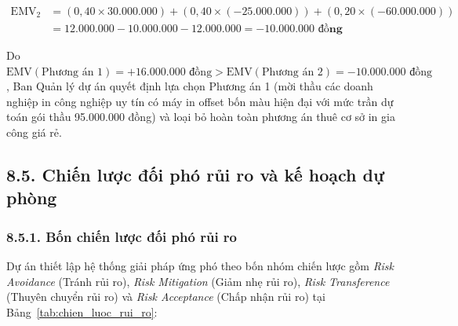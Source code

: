 \begin{equation}
\begin{split}
\text{EMV}_2 &= (0,40 \times 30.000.000) + (0,40 \times (-25.000.000)) + (0,20 \times (-60.000.000)) \\
&= 12.000.000 - 10.000.000 - 12.000.000 = \mathbf{-10.000.000\text{ đồng}}
\end{split}
\end{equation}

Do $\text{EMV}(\text{Phương án 1}) = +16.000.000\text{ đồng} > \text{EMV}(\text{Phương án 2}) = -10.000.000\text{ đồng}$, Ban Quản lý dự án quyết định lựa chọn Phương án 1 (mời thầu các doanh nghiệp in công nghiệp uy tín có máy in offset bốn màu hiện đại với mức trần dự toán gói thầu 95.000.000 đồng) và loại bỏ hoàn toàn phương án thuê cơ sở in gia công giá rẻ.

\subsection{8.5. Chiến lược đối phó rủi ro và kế hoạch dự phòng}

\subsubsection{8.5.1. Bốn chiến lược đối phó rủi ro}

Dự án thiết lập hệ thống giải pháp ứng phó theo bốn nhóm chiến lược gồm \textit{Risk Avoidance} (Tránh rủi ro), \textit{Risk Mitigation} (Giảm nhẹ rủi ro), \textit{Risk Transference} (Thuyên chuyển rủi ro) và \textit{Risk Acceptance} (Chấp nhận rủi ro) tại Bảng~\ref{tab:chien_luoc_rui_ro}:

